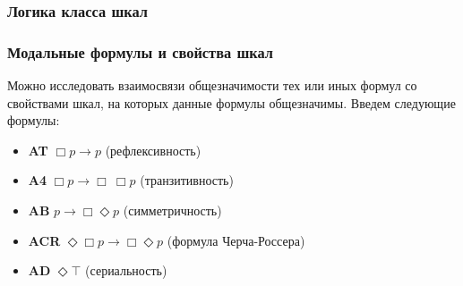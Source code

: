 \documentclass[pdf,utf8,russian,aspectratio=169]{beamer}
\newtheorem{defin}{Определение}
\begin{document}
\begin{frame}
  \frametitle{Логика класса шкал}


\end{frame}

\begin{frame}
  \frametitle{Модальные формулы и свойства шкал}

  Можно исследовать взаимосвязи общезначимости тех или иных формул со свойствами шкал, на которых данные формулы общезначимы. Введем следующие формулы:

  \begin{itemize}
    \item {\bf AT} $\Box p \to p$ (рефлексивность)
    \item {\bf A4} $\Box p \to \Box \: \Box p$ (транзитивность)
    \item {\bf AB} $p \to \Box \Diamond p$ (симметричность)
    \item {\bf ACR} $\Diamond \Box p \to \Box \Diamond p$ (формула Черча-Россера)
    \item {\bf AD} $\Diamond \top$ (сериальность)
  \end{itemize}
\end{frame}
\end{document}
